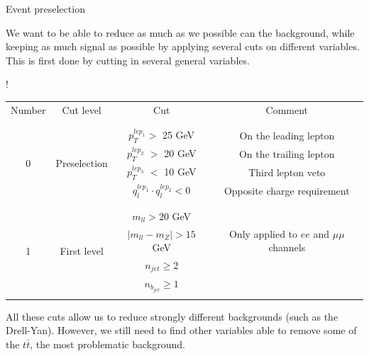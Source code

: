 \documentclass[handout,8 pt]{beamer}
\begin{document}
\begin{frame}{Event preselection}

	\justifying
	We want to be able to reduce as much as we possible can the background, while keeping as much signal as possible by applying several cuts on different variables. This is first done by cutting in several general variables. \vfill  %

\hspace{4pt}
   \begin{minipage}[c]{.02\linewidth}
	\begin{exampleblock}{}  \end{exampleblock}
   \end{minipage}	
   \hspace{2pt}
   \begin{minipage}[c]{.97\linewidth}
   \begin{center}
   \resizebox{300pt} {!}{
   \begin{tabular}{c|c|c|c}
   Number & Cut level & Cut & Comment \\
   	& & & \\
   	\hline \hline
	& & & \\
	  \multirow{4}{*}{0} & \multirow{4}{*}{Preselection} & $p_{T}^{lep_1} >$ 25 GeV & On the leading lepton\\ 
	  & & $p_{T}^{lep_2}$ $>$ 20 GeV & On the trailing lepton \\ 
	  & & $p_{T}^{lep_3}$ $<$ 10 GeV &Third lepton veto \\ 
	  & & $q_{l}^{lep_1} \cdot q_{l}^{lep_2} < 0$ & Opposite charge requirement \\ 
	  & & & \\
	  \hline
	   & & & \\
	  \multirow{4}{*}{1} & \multirow{4}{*}{First level} & $m_{ll} > 20$ GeV &  \\
	  & & $|m_{ll} - m_Z| > 15$ GeV & Only applied to $ee$ and $\mu \mu$ channels \\
	  & & $n_{jet} \geq 2$ &  \\
	  & & $n_{b_{jet}} \geq 1$ &  \\
	  & & & \\
   \end{tabular}
   } 
   \end{center}
   \end{minipage} \hfill \vfill

	\justifying
	All these cuts allow us to reduce strongly different backgrounds (such as the Drell-Yan). However, we still need to find other variables able to remove some of the $t \bar t$, the most problematic background. \vfill

\end{frame}
\end{document}
